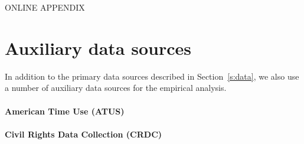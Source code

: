 \documentclass[11pt]{article}
\begin{document}
\renewcommand*{\theHsection}{\arabic{section}.\arabic{section}} 

\renewcommand*{\theHfigure}{\arabic{section}.\arabic{figure}} 
\setcounter{figure}{0}
\renewcommand\thefigure{A.\arabic{figure}}


\renewcommand*{\theHtable}{\arabic{section}.\arabic{table}} 
\setcounter{table}{0}
\renewcommand\thetable{A.\arabic{table}}

\renewcommand{\thesection}{Appendix \Alph{section}}



\begin{center}
\Large ONLINE APPENDIX
\end{center}

\section{Auxiliary data sources} \label{a:auxiliarydata}

In addition to the primary data sources described in Section~\ref{s:data}, we also use a number of auxiliary data sources for the empirical analysis.


\paragraph{American Time Use (ATUS)}

\paragraph{Civil Rights Data Collection (CRDC)}
\end{document}
